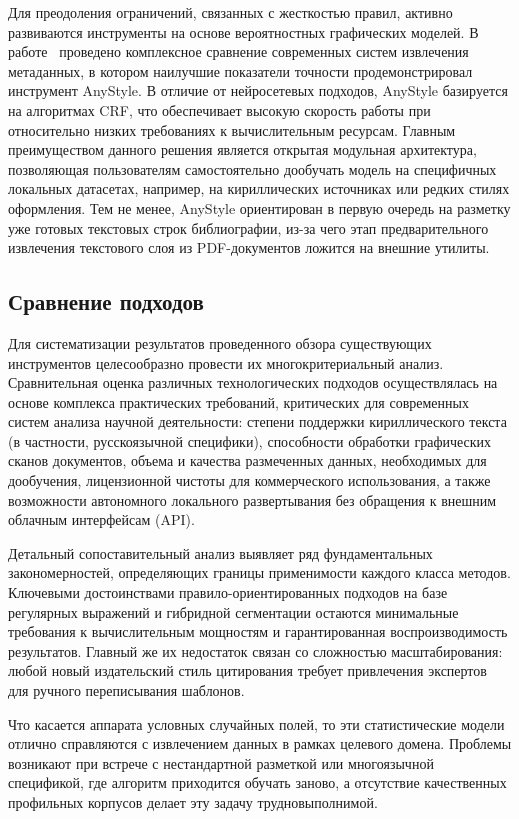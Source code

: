 Для преодоления ограничений, связанных с жесткостью правил, активно развиваются инструменты на основе вероятностных графических моделей. В работе~\cite{tkaczyk2022assessing} проведено комплексное сравнение современных систем извлечения метаданных, в котором наилучшие показатели точности продемонстрировал инструмент AnyStyle. В отличие от нейросетевых подходов, AnyStyle базируется на алгоритмах CRF, что обеспечивает высокую скорость работы при относительно низких требованиях к вычислительным ресурсам. Главным преимуществом данного решения является открытая модульная архитектура, позволяющая пользователям самостоятельно дообучать модель на специфичных локальных датасетах, например, на кириллических источниках или редких стилях оформления. Тем не менее, AnyStyle ориентирован в первую очередь на разметку уже готовых текстовых строк библиографии, из-за чего этап предварительного извлечения текстового слоя из PDF-документов ложится на внешние утилиты.

\subsection{Сравнение подходов}

Для сис\-те\-ма\-ти\-за\-ции результатов проведенного обзора существующих ин\-стру\-мен\-тов це\-ле\-со\-об\-раз\-но провести их многокритериальный анализ. Сравнительная оценка различных технологических подходов осуществлялась на основе комплекса практических требований, критических для современных систем анализа научной деятельности: степени поддержки кириллического текста (в частности, русскоязычной специфики), способности обработки графических сканов документов, объема и качества размеченных данных, необходимых для дообучения, лицензионной чистоты для коммерческого использования, а также возможности автономного локального развертывания без обращения к внешним облачным интерфейсам (API).

Детальный сопоставительный анализ выявляет ряд фундаментальных за\-ко\-но\-мер\-нос\-тей, определяющих границы применимости каждого класса методов. Ключевыми достоинствами правило-ориентированных подходов на базе регулярных выражений и гибридной сегментации остаются минимальные требования к вычислительным мощностям и гарантированная воспроизводимость результатов. Главный же их недостаток связан со сложностью масштабирования: любой новый издательский стиль цитирования требует привлечения экспертов для ручного переписывания шаблонов. 


Что касается аппарата условных случайных полей, то эти статистические модели отлично справляются с извлечением данных в рамках целевого домена. Проблемы возникают при встрече с нестандартной разметкой или многоязычной спецификой, где алгоритм приходится обучать заново, а отсутствие качественных профильных корпусов делает эту задачу трудновыполнимой.

